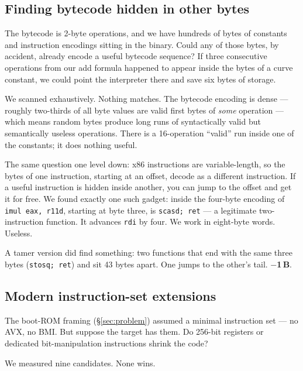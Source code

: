 \documentclass[11pt,a4paper]{article}
\newcommand{\saved}[1]{\textcolor{green!50!black}{\textbf{$-$#1\,B}}}
\begin{document}
\subsection{Finding bytecode hidden in other bytes}

The bytecode is 2-byte operations, and we have hundreds of bytes of
constants and instruction encodings sitting in the binary. Could any
of those bytes, by accident, already encode a useful bytecode
sequence? If three consecutive operations from our add formula happened
to appear inside the bytes of a curve constant, we could point the
interpreter there and save six bytes of storage.

We scanned exhaustively. Nothing matches. The bytecode encoding is
dense --- roughly two-thirds of all byte values are valid first bytes
of \emph{some} operation --- which means random bytes produce long runs
of syntactically valid but semantically useless operations. There is a
16-operation ``valid'' run inside one of the constants; it does
nothing useful.

The same question one level down: x86 instructions are
variable-length, so the bytes of one instruction, starting at an
offset, decode as a different instruction. If a useful instruction is
hidden inside another, you can jump to the offset and get it for free.
We found exactly one such gadget: inside the four-byte encoding of
\texttt{imul eax, r11d}, starting at byte three, is \texttt{scasd;
ret} --- a legitimate two-instruction function. It advances \texttt{rdi}
by four. We work in eight-byte words. Useless.

A tamer version did find something: two functions that end with the
same three bytes (\texttt{stosq; ret}) and sit 43 bytes apart. One
jumps to the other's tail. \saved{1}.

\subsection{Modern instruction-set extensions}

The boot-ROM framing (\S\ref{sec:problem}) assumed a minimal
instruction set --- no AVX, no BMI. But suppose the target has them.
Do 256-bit registers or dedicated bit-manipulation instructions
shrink the code?

We measured nine candidates. None wins.
\end{document}
